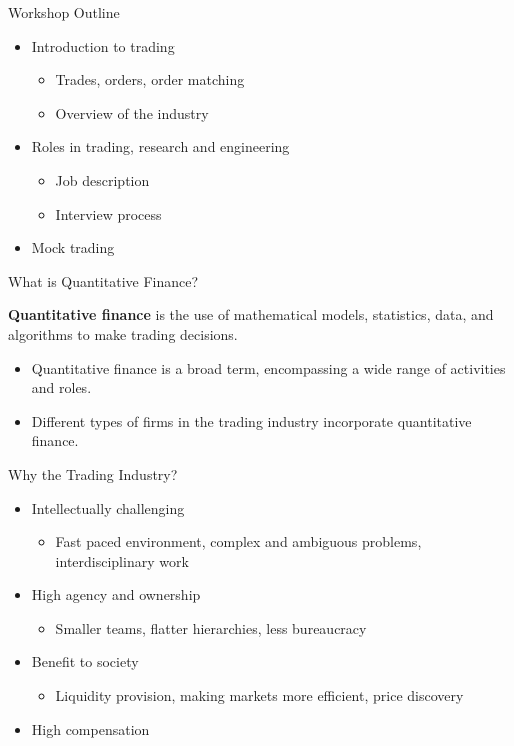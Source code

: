 \begin{frame}{Workshop Outline}
  \begin{itemize}
    \item Introduction to trading
    \begin{itemize}
      \item Trades, orders, order matching
      \item Overview of the industry
    \end{itemize}
    \item Roles in trading, research and engineering
    \begin{itemize}
      \item Job description
      \item Interview process
    \end{itemize}
    \item Mock trading
  \end{itemize}
\end{frame}

\begin{frame}{What is Quantitative Finance?}
  \begin{sqt:definition}
    \textbf{Quantitative finance} is the use of mathematical models, statistics, data,
    and algorithms to make trading decisions.
  \end{sqt:definition}

  \begin{itemize}
    \item Quantitative finance is a broad term, encompassing a wide range of activities and roles.
    \item Different types of firms in the trading industry incorporate quantitative finance.
  \end{itemize}
\end{frame}

\begin{frame}{Why the Trading Industry?}
  \begin{itemize}
    \item Intellectually challenging
    \begin{itemize}
      \item Fast paced environment, complex and ambiguous problems, interdisciplinary work
    \end{itemize}
    \item High agency and ownership
    \begin{itemize}
      \item Smaller teams, flatter hierarchies, less bureaucracy
    \end{itemize}
    \item Benefit to society
    \begin{itemize}
      \item Liquidity provision, making markets more efficient, price discovery
    \end{itemize}
    \item High compensation
  \end{itemize}
\end{frame}
